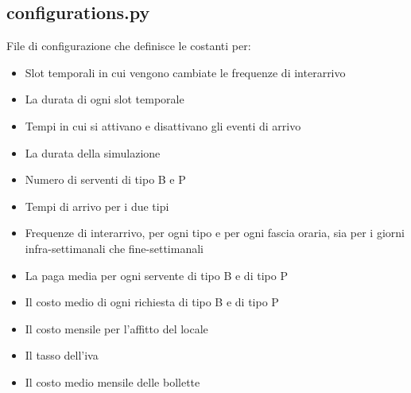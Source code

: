 \documentclass[a4paper, 12pt]{article}
\begin{document}
\subsection{configurations.py}
File di configurazione che definisce le costanti per:
\begin{itemize}
  \item Slot temporali in cui vengono cambiate le frequenze di interarrivo
  \item La durata di ogni slot temporale
  \item Tempi in cui si attivano e disattivano gli eventi di arrivo
  \item La durata della simulazione
  \item Numero di serventi di tipo B e P
  \item Tempi di arrivo per i due tipi 
  \item Frequenze di interarrivo, per ogni tipo e per ogni fascia oraria, sia
per i giorni infra-settimanali che fine-settimanali
  \item La paga media per ogni servente di tipo B e di tipo P
  \item Il costo medio di ogni richiesta di tipo B e di tipo P
  \item Il costo mensile per l'affitto del locale
  \item Il tasso dell'iva
  \item Il costo medio mensile delle bollette 
\end{itemize}
\end{document}
